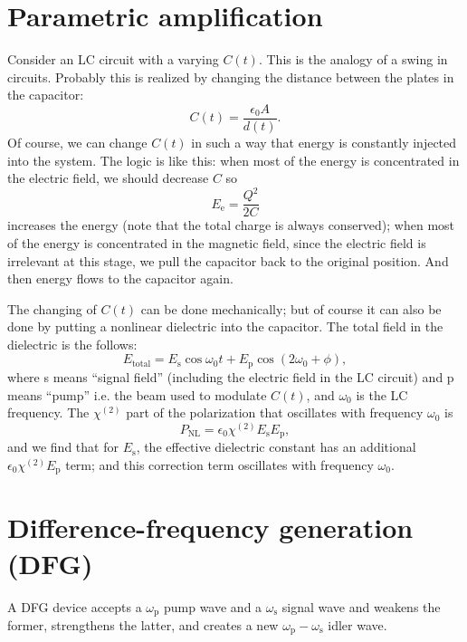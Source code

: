 \documentclass[hyperref, a4paper]{article}
\begin{document}
\section{Parametric amplification}

Consider an LC circuit with a varying $C(t)$.
This is the analogy of a swing in circuits.
Probably this is realized by changing the distance between the plates in the capacitor:
\begin{equation}
    C(t) = \frac{\epsilon_0 A}{d(t)}.
\end{equation}
Of course, we can change $C(t)$ in such a way 
that energy is constantly injected into the system.
The logic is like this:
when most of the energy is concentrated in the electric field, 
we should decrease $C$ so 
\begin{equation}
    E_\text{e} = \frac{Q^2}{2 C} 
\end{equation}
increases the energy (note that the total charge is always conserved);
when most of the energy is concentrated in the magnetic field, 
since the electric field is irrelevant at this stage, 
we pull the capacitor back to the original position.
And then energy flows to the capacitor again.

The changing of $C(t)$ can be done mechanically; 
but of course it can also be done by putting a nonlinear dielectric 
into the capacitor.
The total field in the dielectric is the follows:
\begin{equation}
    E_{\text{total}} = E_{\text{s}} \cos \omega_0 t
    + E_{\text{p}} \cos(2\omega_0 + \phi),
\end{equation}
where s means ``signal field'' (including the electric field in the LC circuit) 
and p means ``pump'' i.e. the beam used to modulate $C(t)$, 
and $\omega_0$ is the LC frequency.
The $\chi^{(2)}$ part of the polarization that oscillates  
with frequency $\omega_0$ is 
\begin{equation}
    P_{\text{NL}} = \epsilon_0 \chi^{(2)} E_{\text{s}} E_{\text{p}},
\end{equation}
and we find that for $E_{\text{s}}$, 
the effective dielectric constant has an additional $\epsilon_0 \chi^{(2)} E_{\text{p}}$ term; 
and this correction term oscillates with frequency $\omega_0$.

\section{Difference-frequency generation (DFG)}

A DFG device accepts a $\omega_{\text{p}}$ pump wave 
and a $\omega_{\text{s}}$ signal wave 
and weakens the former, strengthens the latter, 
and creates a new $\omega_{\text{p}} - \omega_{\text{s}}$ idler wave.
\end{document}
